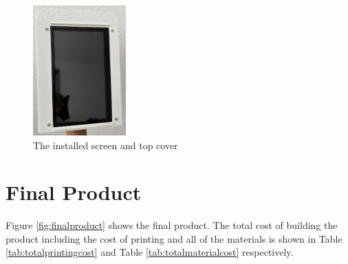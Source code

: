 \begin{figure}[!ht]
    \centering
    \includegraphics[height=5cm]{texs/Part1/chapter5/image/screeninstall.jpg}
    \caption{The installed screen and top cover}
    \label{fig:screeninstall}
\end{figure}

\section{Final Product}
\label{sec:finalproduct}

Figure \ref{fig:finalproduct} shows the final product. The total cost of building the product including the cost of printing and all of the materials is shown in Table \ref{tab:totalprintingcost} and Table \ref{tab:totalmaterialcost} respectively.

